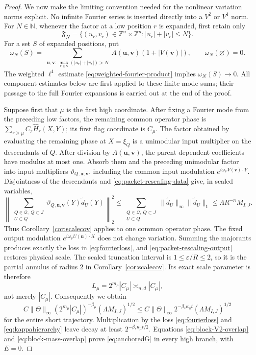 \documentclass[11pt]{article}
\numberwithin{equation}{section}
\theoremstyle{remark}
\theoremstyle{definition}
\newcommand{\norm}[1]{\lVert #1\rVert}
\begin{document}
\begin{proof}
We now make the limiting convention needed for the nonlinear variation
norms explicit.  No infinite Fourier series is inserted directly into a
$V^2$ or $V^1$ norm.  For $N\in\mathbb N$, whenever the factor at a low
position $r$ is expanded, first retain only
\[
 \mathfrak F_N=\{(u_r,v_r)\in\mathbb Z^n\times\mathbb Z^n:
                    |u_r|+|v_r|\le N\}.
\]
For a set $S$ of expanded positions, put
\begin{equation}\label{eq:fourier-tail-majorant}
 \omega_N(S)=
 \sum_{\substack{\mathbf u,\mathbf v:\
       \max_{r\in S}(|u_r|+|v_r|)>N}}
 A(\mathbf u,\mathbf v)(1+|V(\mathbf v)|),
 \qquad \omega_N(\varnothing)=0.
\end{equation}
The weighted $\ell^1$ estimate
\eqref{eq:weighted-fourier-product} implies
$\omega_N(S)\to0$.  All component estimates below are first applied to
these finite mode sums; their passage to the full Fourier expansions is
carried out at the end of the proof.

Suppose first that $\mu$ is the first high coordinate.  After fixing a
Fourier mode from the preceding low factors, the remaining common operator
phase is
$\sum_{r\ge\mu}C_r\widehat H_r(X,Y)$; its first flag coordinate is
$C_\mu$.  The factor obtained by evaluating the remaining phase at
$X=\xi_Q$ is a unimodular input multiplier on the descendants of $Q$.
After division by $A(\mathbf u,\mathbf v)$, the parent-dependent
coefficients have modulus at most one.  Absorb them and the preceding
unimodular factor into input multipliers
$\vartheta_{Q,\mathbf u,\mathbf v}$, including the common input
modulation $e^{i\omega_F V(\mathbf v)\cdot Y}$.  Disjointness of the descendants and
\eqref{eq:packet-rescaling-data} give, in scaled variables,
\begin{equation}\label{eq:high-branch-input-L2}
 \left\|\sum_{\substack{Q\in\mathcal Q,\ Q\subset J\\U\subset Q}}
          \vartheta_{Q,\mathbf u,\mathbf v}(Y)
          \widetilde d_U(Y)\right\|_2^2
 \le\sum_{\substack{Q\in\mathcal Q,\ Q\subset J\\U\subset Q}}
             \norm{\widetilde d_U}_\infty
             \norm{\widetilde d_U}_1
 \le\Lambda R^{-n}M_{I,J}.
\end{equation}
Thus Corollary~\ref{cor:scalecov} applies to one common operator phase.
The fixed output modulation $e^{i\omega_F U(\mathbf u)\cdot X}$ does not change
variation.  Summing the majorants produces exactly the loss in
\eqref{eq:fourierloss}, and \eqref{eq:packet-rescaling-output} restores
physical scale.  The scaled truncation interval is $1\le\varepsilon/R\le2$,
so it is the partial annulus of radius $2$ in
Corollary~\ref{cor:scalecov}.  Its exact scale parameter is therefore
\[
 L_\mu=2^{m_\mu}|C_\mu|\asymp_{n,d}|C_\mu|,
\]
not merely $|C_\mu|$.  Consequently we obtain
\[
 C\norm\Theta_\infty (2^{m_\mu}|C_\mu|)^{-\beta_\mu}
 (\Lambda M_{I,J})^{1/2}
 \le C\norm\Theta_\infty2^{-\beta_*\kappa_\mu t}
 (\Lambda M_{I,J})^{1/2}
\]
for the entire short trajectory.  Multiplication by the loss
\eqref{eq:fourierloss} and \eqref{eq:kappahierarchy} leave decay at least
$2^{-\beta_*\kappa_\mu t/2}$.  Equations
\eqref{eq:block-V2-overlap} and \eqref{eq:block-mass-overlap} prove
\eqref{eq:anchoredG} in every high branch, with $E=0$.


\end{proof}
\end{document}
